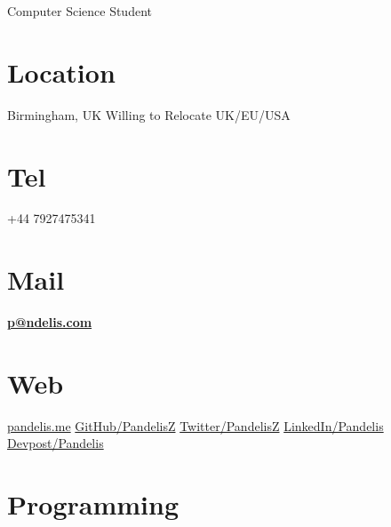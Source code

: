 \documentclass[]{friggeri-cv}
\begin{document}
      {Computer Science Student}
      

\begin{aside}
  \section{Location}
    Birmingham, UK
    Willing to Relocate
    UK/EU/USA
    ~
  \section{Tel}
    +44 7927475341
    ~
  \section{Mail}
    \href{mailto:p@ndelis.com}{\textbf{p@ndelis.com}}
    ~
  \section{Web}
    \href{http://pandelis.me}{pandelis.me}
    \href{https://github.com/pandelisz}{GitHub/PandelisZ}
    \href{https://twitter.com/pandelisz}{Twitter/PandelisZ}
    \href{https://linkedin.com/in/pandelis}{LinkedIn/Pandelis}
    \href{https://devpost.com/pandelis}{Devpost/Pandelis}
    ~
  \section{Programming}
    

\end{aside}
\end{document}
